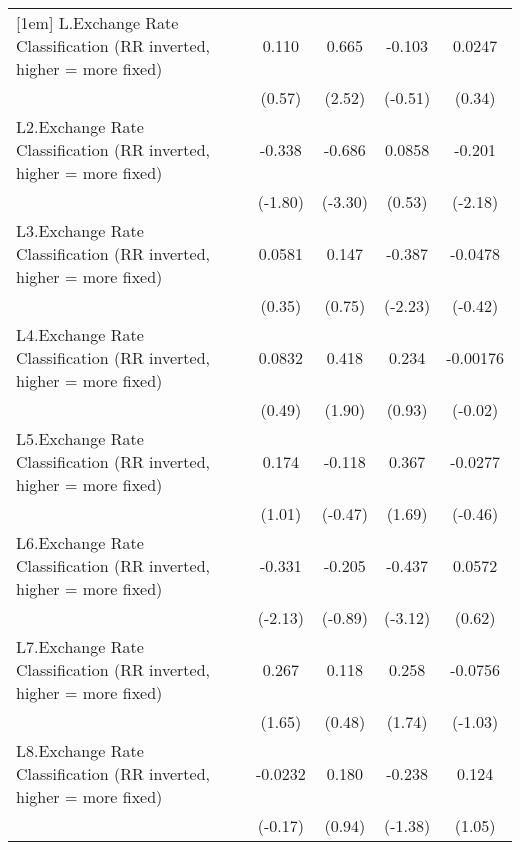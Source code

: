 {\begin{longtable}{l*{4}{c}}
[1em]
L.Exchange Rate Classification (RR inverted, higher = more fixed)&    0.110         &    0.665\sym{*}  &   -0.103         &   0.0247         \\
                &   (0.57)         &   (2.52)         &  (-0.51)         &   (0.34)         \\
[1em]
L2.Exchange Rate Classification (RR inverted, higher = more fixed)&   -0.338         &   -0.686\sym{***}&   0.0858         &   -0.201\sym{*}  \\
                &  (-1.80)         &  (-3.30)         &   (0.53)         &  (-2.18)         \\
[1em]
L3.Exchange Rate Classification (RR inverted, higher = more fixed)&   0.0581         &    0.147         &   -0.387\sym{*}  &  -0.0478         \\
                &   (0.35)         &   (0.75)         &  (-2.23)         &  (-0.42)         \\
[1em]
L4.Exchange Rate Classification (RR inverted, higher = more fixed)&   0.0832         &    0.418         &    0.234         & -0.00176         \\
                &   (0.49)         &   (1.90)         &   (0.93)         &  (-0.02)         \\
[1em]
L5.Exchange Rate Classification (RR inverted, higher = more fixed)&    0.174         &   -0.118         &    0.367         &  -0.0277         \\
                &   (1.01)         &  (-0.47)         &   (1.69)         &  (-0.46)         \\
[1em]
L6.Exchange Rate Classification (RR inverted, higher = more fixed)&   -0.331\sym{*}  &   -0.205         &   -0.437\sym{**} &   0.0572         \\
                &  (-2.13)         &  (-0.89)         &  (-3.12)         &   (0.62)         \\
[1em]
L7.Exchange Rate Classification (RR inverted, higher = more fixed)&    0.267         &    0.118         &    0.258         &  -0.0756         \\
                &   (1.65)         &   (0.48)         &   (1.74)         &  (-1.03)         \\
[1em]
L8.Exchange Rate Classification (RR inverted, higher = more fixed)&  -0.0232         &    0.180         &   -0.238         &    0.124         \\
                &  (-0.17)         &   (0.94)         &  (-1.38)         &   (1.05)         \\

\end{longtable}}
